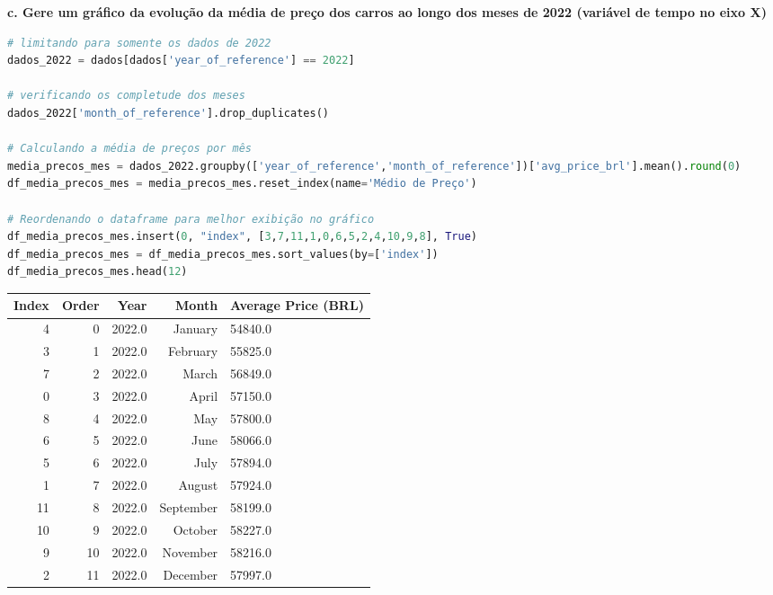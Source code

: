 \begin{adjustwidth}{1em}{}
\textbf{c. Gere um gráfico da evolução da média de preço dos carros ao longo dos meses de 2022 (variável de tempo no eixo X)}
\end{adjustwidth}
\begin{lstlisting}[language=Python, style=input]
# limitando para somente os dados de 2022
dados_2022 = dados[dados['year_of_reference'] == 2022]

# verificando os completude dos meses
dados_2022['month_of_reference'].drop_duplicates()

# Calculando a média de preços por mês
media_precos_mes = dados_2022.groupby(['year_of_reference','month_of_reference'])['avg_price_brl'].mean().round(0) 
df_media_precos_mes = media_precos_mes.reset_index(name='Médio de Preço')

# Reordenando o dataframe para melhor exibição no gráfico
df_media_precos_mes.insert(0, "index", [3,7,11,1,0,6,5,2,4,10,9,8], True)
df_media_precos_mes = df_media_precos_mes.sort_values(by=['index'])
df_media_precos_mes.head(12)
\end{lstlisting}
\begin{table}[H]
\centering
\begin{tcolorbox}[myoutputstyle]
\begin{tabular}{rrrrl}
\hline
\textbf{Index} & \textbf{Order} & \textbf{Year} & \textbf{Month} & \textbf{Average Price (BRL)} \\
\hline
4 & 0 & 2022.0 & January & 54840.0 \\
3 & 1 & 2022.0 & February & 55825.0 \\
7 & 2 & 2022.0 & March & 56849.0 \\
0 & 3 & 2022.0 & April & 57150.0 \\
8 & 4 & 2022.0 & May & 57800.0 \\
6 & 5 & 2022.0 & June & 58066.0 \\
5 & 6 & 2022.0 & July & 57894.0 \\
1 & 7 & 2022.0 & August & 57924.0 \\
11 & 8 & 2022.0 & September & 58199.0 \\
10 & 9 & 2022.0 & October & 58227.0 \\
9 & 10 & 2022.0 & November & 58216.0 \\
2 & 11 & 2022.0 & December & 57997.0 \\
\hline
\end{tabular}
\end{tcolorbox}
\end{table}
